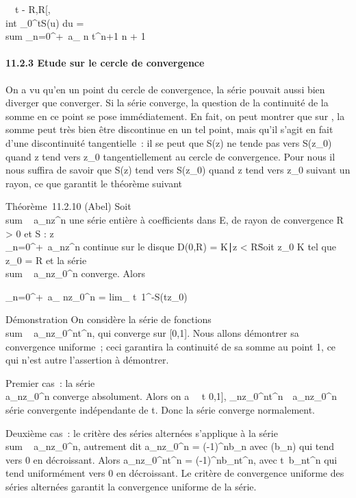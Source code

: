 \documentclass[]{article}
\begin{document}
\forall~~t \in{]} - R,R{[}, \\int
 _0^tS(u) du = \\sum
_n=0^+\infty~a_ n t^n+1
\over n + 1

\paragraph{11.2.3 Etude sur le cercle de convergence}

On a vu qu'en un point du cercle de convergence, la série pouvait aussi
bien diverger que converger. Si la série converge, la question de la
continuité de la somme en ce point se pose immédiatement. En fait, on
peut montrer que sur , la somme peut très bien être discontinue en un
tel point, mais qu'il s'agit en fait d'une discontinuité tangentielle~:
il se peut que S(z) ne tende pas vers S(z_0) quand z tend vers
z_0 tangentiellement au cercle de convergence. Pour nous il
nous suffira de savoir que S(z) tend vers S(z_0) quand z tend
vers z_0 suivant un rayon, ce que garantit le théorème suivant

Théorème~11.2.10 (Abel) Soit
\\sum ~
a_nz^n une série entière à coefficients dans E, de
rayon de convergence R \textgreater{} 0 et S :
z\mapsto~\\\sum
 _n=0^+\infty~a_nz^n continue sur le
disque D(0,R) = \z \in
K∣z \textless{}
R\. Soit z_0 \in K tel que
z_0 = R et la série
\\sum ~
a_nz_0^n converge. Alors

\sum _n=0^+\infty~a_
nz_0^n = lim_
t\rightarrow~1^-S(tz_0)

Démonstration On considère la série de fonctions
\\sum ~
a_nz_0^nt^n, qui converge sur
{[}0,1{]}. Nous allons démontrer sa convergence uniforme~; ceci
garantira la continuité de sa somme au point 1, ce qui n'est autre
l'assertion à démontrer.

Premier cas~: la série \\\sum
 a_nz_0^n converge absolument. Alors on a
\forall~~t \in {[}0,1{]},
\a_nz_0^nt^n\
\leq\
a_nz_0^n\, série
convergente indépendante de t. Donc la série converge normalement.

Deuxième cas~: le critère des séries alternées s'applique à la série
\\sum ~
a_nz_0^n, autrement dit
a_nz_0^n = (-1)^nb_n avec
(b_n) qui tend vers 0 en décroissant. Alors
a_nz_0^nt^n =
(-1)^nb_nt^n, avec
t\mapsto~b_nt^n qui tend
uniformément vers 0 en décroissant. Le critère de convergence uniforme
des séries alternées garantit la convergence uniforme de la série.
\end{document}
